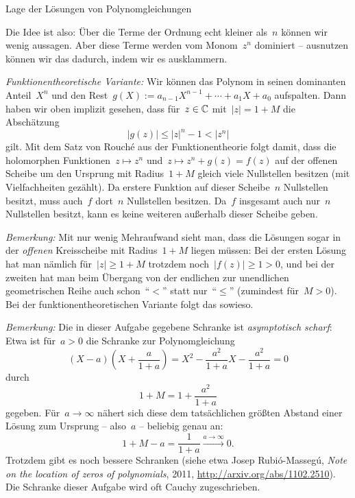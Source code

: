\documentclass{algblatt}
\begin{document}
\begin{aufgabe}{Lage der Lösungen von Polynomgleichungen}
\begin{loesung}
Die Idee ist also: Über die Terme der Ordnung echt kleiner als~$n$ können wir
wenig aussagen. Aber diese Terme werden vom Monom~$z^n$ dominiert -- ausnutzen
können wir das dadurch, indem wir es ausklammern.

\emph{Funktionentheoretische Variante:} Wir können das Polynom in seinen
dominanten Anteil~$X^n$ und den Rest~$g(X) := a_{n-1}X^{n-1} + \cdots + a_1X +
a_0$ aufspalten. Dann haben wir oben implizit gesehen, dass für~$z \in \mathbb{C}$
mit~$|z| = 1 + M$ die Abschätzung
\[ |g(z)| \leq |z|^n - 1 < |z^n| \]
gilt. Mit dem Satz von Rouché aus der Funktionentheorie folgt damit, dass die
holomorphen Funktionen~$z \mapsto z^n$ und~$z \mapsto z^n + g(z) = f(z)$ auf
der offenen Scheibe um den Ursprung mit Radius~$1 + M$ gleich viele Nullstellen
besitzen (mit Vielfachheiten gezählt). Da erstere Funktion auf dieser
Scheibe~$n$ Nullstellen besitzt, muss auch~$f$ dort~$n$ Nullstellen besitzen. Da~$f$
insgesamt auch nur~$n$ Nullstellen besitzt, kann es keine weiteren außerhalb
dieser Scheibe geben.

\emph{Bemerkung:} Mit nur wenig Mehraufwand sieht man, dass die Lösungen sogar
in der \emph{offenen} Kreisscheibe mit Radius~$1 + M$ liegen müssen: Bei der
ersten Lösung hat man nämlich für~$|z| \geq 1 + M$ trotzdem noch~$|f(z)| \geq 1
> 0$, und bei der zweiten hat man beim Übergang von der endlichen zur
unendlichen geometrischen Reihe auch schon~"`$<$"' statt nur~"`$\leq$"'
(zumindest für~$M > 0$). Bei der funktionentheoretischen Variante folgt das
sowieso.

\emph{Bemerkung:} Die in dieser Aufgabe gegebene Schranke ist \emph{asymptotisch
scharf}: Etwa ist für~$a > 0$ die Schranke zur Polynomgleichung
\[ \left(X - a\right) \left(X + \frac{a}{1+a}\right) =
  X^2 - \frac{a^2}{1 + a} X - \frac{a^2}{1+a} = 0 \]
durch
\[ 1 + M = 1 + \frac{a^2}{1 + a} \]
gegeben. Für~$a \to \infty$ nähert sich diese dem tatsächlichen größten
Abstand einer Lösung zum Ursprung -- also~$a$ -- beliebig genau an:
\[ 1 + M - a = \frac{1}{1 + a} \xrightarrow{a \to \infty} 0. \]
Trotzdem gibt es noch bessere Schranken (siehe etwa Josep Rubió-Massegú,
\emph{Note on the location of zeros of polynomials}, 2011,
\url{http://arxiv.org/abs/1102.2510}). Die Schranke dieser Aufgabe wird
oft Cauchy zugeschrieben.
\end{loesung}
\end{aufgabe}
\end{document}
